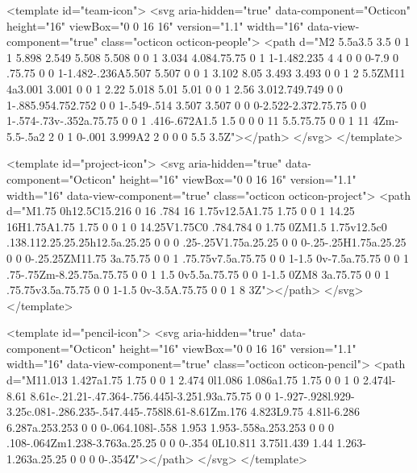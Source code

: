 <template id="team-icon">
  <svg aria-hidden="true" data-component="Octicon" height="16" viewBox="0 0 16 16" version="1.1" width="16" data-view-component="true" class="octicon octicon-people">
    <path d="M2 5.5a3.5 3.5 0 1 1 5.898 2.549 5.508 5.508 0 0 1 3.034 4.084.75.75 0 1 1-1.482.235 4 4 0 0 0-7.9 0 .75.75 0 0 1-1.482-.236A5.507 5.507 0 0 1 3.102 8.05 3.493 3.493 0 0 1 2 5.5ZM11 4a3.001 3.001 0 0 1 2.22 5.018 5.01 5.01 0 0 1 2.56 3.012.749.749 0 0 1-.885.954.752.752 0 0 1-.549-.514 3.507 3.507 0 0 0-2.522-2.372.75.75 0 0 1-.574-.73v-.352a.75.75 0 0 1 .416-.672A1.5 1.5 0 0 0 11 5.5.75.75 0 0 1 11 4Zm-5.5-.5a2 2 0 1 0-.001 3.999A2 2 0 0 0 5.5 3.5Z"></path>
</svg>
</template>

<template id="project-icon">
  <svg aria-hidden="true" data-component="Octicon" height="16" viewBox="0 0 16 16" version="1.1" width="16" data-view-component="true" class="octicon octicon-project">
    <path d="M1.75 0h12.5C15.216 0 16 .784 16 1.75v12.5A1.75 1.75 0 0 1 14.25 16H1.75A1.75 1.75 0 0 1 0 14.25V1.75C0 .784.784 0 1.75 0ZM1.5 1.75v12.5c0 .138.112.25.25.25h12.5a.25.25 0 0 0 .25-.25V1.75a.25.25 0 0 0-.25-.25H1.75a.25.25 0 0 0-.25.25ZM11.75 3a.75.75 0 0 1 .75.75v7.5a.75.75 0 0 1-1.5 0v-7.5a.75.75 0 0 1 .75-.75Zm-8.25.75a.75.75 0 0 1 1.5 0v5.5a.75.75 0 0 1-1.5 0ZM8 3a.75.75 0 0 1 .75.75v3.5a.75.75 0 0 1-1.5 0v-3.5A.75.75 0 0 1 8 3Z"></path>
</svg>
</template>

<template id="pencil-icon">
  <svg aria-hidden="true" data-component="Octicon" height="16" viewBox="0 0 16 16" version="1.1" width="16" data-view-component="true" class="octicon octicon-pencil">
    <path d="M11.013 1.427a1.75 1.75 0 0 1 2.474 0l1.086 1.086a1.75 1.75 0 0 1 0 2.474l-8.61 8.61c-.21.21-.47.364-.756.445l-3.251.93a.75.75 0 0 1-.927-.928l.929-3.25c.081-.286.235-.547.445-.758l8.61-8.61Zm.176 4.823L9.75 4.81l-6.286 6.287a.253.253 0 0 0-.064.108l-.558 1.953 1.953-.558a.253.253 0 0 0 .108-.064Zm1.238-3.763a.25.25 0 0 0-.354 0L10.811 3.75l1.439 1.44 1.263-1.263a.25.25 0 0 0 0-.354Z"></path>
</svg>
</template>

